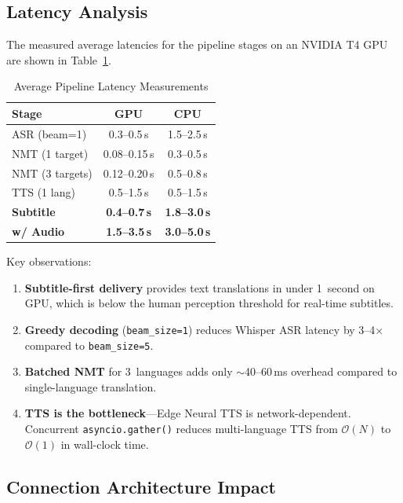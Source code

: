 \documentclass[conference]{IEEEtran}
\begin{document}
\subsection{Latency Analysis}

The measured average latencies for the pipeline stages on an NVIDIA T4 GPU are shown in Table~\ref{tab:latency}.

\begin{table}[htbp]
\centering
\caption{Average Pipeline Latency Measurements}
\label{tab:latency}
\begin{tabular}{lcc}
\toprule
\textbf{Stage} & \textbf{GPU} & \textbf{CPU} \\
\midrule
ASR (beam=1) & 0.3--0.5\,s & 1.5--2.5\,s \\
NMT (1 target) & 0.08--0.15\,s & 0.3--0.5\,s \\
NMT (3 targets) & 0.12--0.20\,s & 0.5--0.8\,s \\
TTS (1 lang) & 0.5--1.5\,s & 0.5--1.5\,s \\
\midrule
\textbf{Subtitle} & \textbf{0.4--0.7\,s} & \textbf{1.8--3.0\,s} \\
\textbf{w/ Audio} & \textbf{1.5--3.5\,s} & \textbf{3.0--5.0\,s} \\
\bottomrule
\end{tabular}
\end{table}

Key observations:
\begin{enumerate}
  \item \textbf{Subtitle-first delivery} provides text translations in under 1~second on GPU, which is below the human perception threshold for real-time subtitles.
  \item \textbf{Greedy decoding} (\texttt{beam\_size=1}) reduces Whisper ASR latency by 3--4$\times$ compared to \texttt{beam\_size=5}.
  \item \textbf{Batched NMT} for 3~languages adds only $\sim$40--60\,ms overhead compared to single-language translation.
  \item \textbf{TTS is the bottleneck}---Edge Neural TTS is network-dependent. Concurrent \texttt{asyncio.gather()} reduces multi-language TTS from $\mathcal{O}(N)$ to $\mathcal{O}(1)$ in wall-clock time.
\end{enumerate}

\subsection{Connection Architecture Impact}
\end{document}

